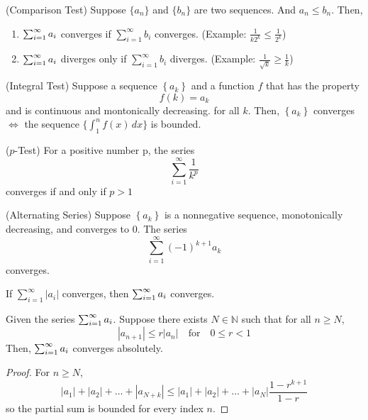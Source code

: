 \documentclass{article}
\begin{document}
\begin{theorem}
    (Comparison Test)
    Suppose $\{a_n\}$ and $\{b_n\}$ are two sequences. And $a_n\leq b_n$. Then,
    \begin{enumerate}
        \item $\sum_{i=1}^\infty a_i$ converges if $\sum_{i=1}^\infty b_i$ converges.
        (Example: $\frac{1}{k2^k} \leq \frac{1}{2^k}$)
        \item $\sum_{i=1}^\infty a_i$ diverges only if $\sum_{i=1}^\infty b_i$ diverges.
        (Example: $\frac{1}{\sqrt{k}}\geq \frac{1}{k}$)
    \end{enumerate}
\end{theorem}

\begin{theorem}
    (Integral Test)
    Suppose a sequence $\left\{ a_k \right\}$ and a function $f$ that has the property
    \[ f(k) = a_k \]  and is continuous and montonically decreasing.
    for all $k$. Then, $\left\{ a_k \right\}$ converges $\Longleftrightarrow$
    the sequence $\{\int_1^n f(x)\, dx\}$ is bounded. 
\end{theorem}

\begin{theorem}
    ($p$-Test)
    For a positive number p, the series
    \[ \sum_{i=1}^\infty \frac{1}{k^p} \]
    converges if and only if $p>1$
\end{theorem}

\begin{theorem}
    (Alternating Series)
    Suppose $\left\{ a_k \right\}$ is a nonnegative sequence, monotonically
    decreasing, and converges to 0. The series
    \[ \sum_{i=1}^\infty (-1)^{k+1}a_k \]
    converges.
\end{theorem}

\begin{theorem}
    If $\sum_{i=1}^\infty |a_i|$ converges, then $\sum_{i=1}^\infty a_i$ converges.
\end{theorem}

\begin{theorem}
    Given the series $\sum_{i=1}^\infty a_i$. Suppose there exists $N\in \mathbb{N}$ such that 
    for all $n\geq N$,
    \[ |a_{n+1}|\leq r|a_n| \quad \textrm{for} \quad 0\leq r < 1 \]
    Then, $\sum_{i=1}^\infty a_i$ converges absolutely.
\end{theorem}

\begin{proof}
    For $n\geq N$,
    \[ |a_1| + |a_2| + \hdots + |a_{N+k}| \leq |a_1| + |a_2| + \hdots + |a_N|\frac{1-r^{k+1}}{1-r} \]
    so the partial sum is bounded for every index $n$.
\end{proof}
\end{document}
